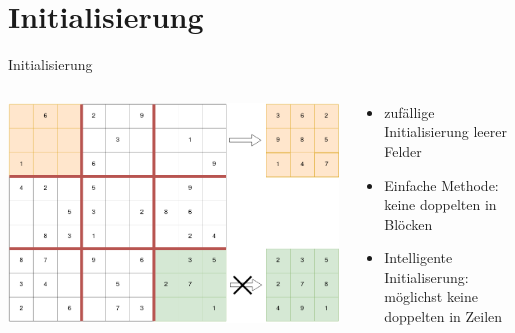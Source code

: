 \section{Initialisierung}
\begin{frame}{Initialisierung}
    \begin{columns}[T] %
        \begin{column}{0.75\textwidth}
            \includegraphics[width=\textwidth]{Pictures/Initialisierung.png}
        \end{column}
        \begin{column}{0.35\textwidth}
            \begin{itemize}
                \item zufällige Initialisierung leerer Felder
                \item Einfache Methode: keine doppelten in Blöcken
                \item Intelligente Initialiserung: möglichst keine doppelten in Zeilen
            \end{itemize}
        \end{column}
    \end{columns}
\end{frame}
